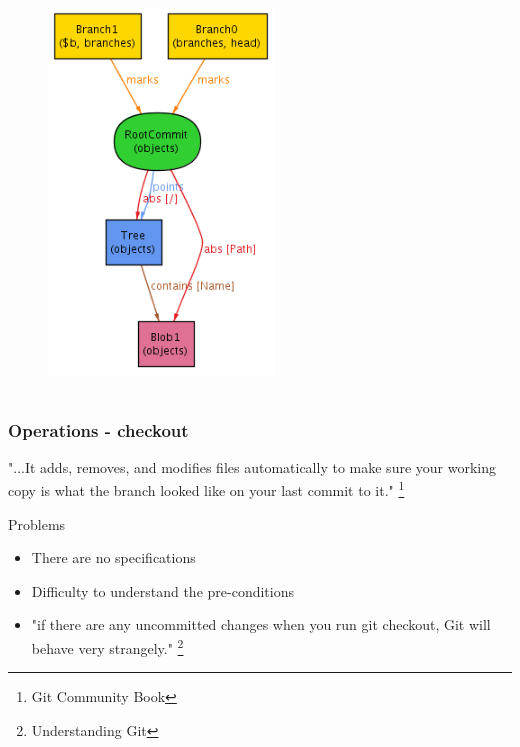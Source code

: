 \documentclass{beamer}
\begin{document}
\begin{frame}[fragile]
\begin{columns}[c]
\begin{figure}
         \includegraphics[width=0.90\textwidth]{images/branch2.png}
      \end{figure}
   \end{columns}
\end{frame}

\begin{frame}[fragile]
   \frametitle{Operations - checkout}
	 "...It adds, removes, and modifies files automatically to make 
	 sure your working copy is what the branch looked like on your last commit to it."	 
	 \footnote{Git Community Book}

   \begin{block}{Problems}
      \begin{itemize}
         \item There are no specifications
	 \item Difficulty to understand the pre-conditions
	 \item "if there are any uncommitted changes when you run git checkout,
	 Git will behave very strangely." \footnote{Understanding Git}
	\end{itemize}
   \end{block}
\end{frame}
\end{document}
